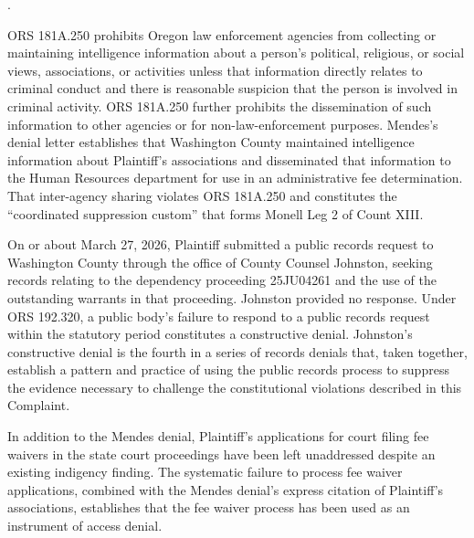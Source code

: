 \documentclass[12pt,letterpaper]{article}
\newcounter{complaintpara}
\newenvironment{paras}{%
	\begin{list}{\arabic{complaintpara}.}{%
			\setlength{\leftmargin}{0.5in}%
			\setlength{\labelwidth}{0.4in}%
			\setlength{\labelsep}{0.1in}%
			\setlength{\itemsep}{0pt}%
			\setlength{\parsep}{0pt}%
			\setlength{\topsep}{6pt}%
		}%
	}{%
	\end{list}%
}
\begin{document}
\begin{paras}
		\item\label{fact:181a250} ORS 181A.250 prohibits Oregon law
		enforcement agencies from collecting or maintaining
		intelligence information about a person's political,
		religious, or social views, associations, or activities unless
		that information directly relates to criminal conduct and there
		is reasonable suspicion that the person is involved in
		criminal activity. ORS 181A.250 further prohibits the
		dissemination of such information to other agencies or for
		non-law-enforcement purposes. Mendes's denial letter
		establishes that Washington County maintained intelligence
		information about Plaintiff's associations and disseminated
		that information to the Human Resources department for use in
		an administrative fee determination. That inter-agency sharing
		violates ORS 181A.250 and constitutes the ``coordinated suppression custom'' that forms Monell Leg 2 of Count XIII.
		
		\item\label{fact:johnston} On or about March 27, 2026, Plaintiff
		submitted a public records request to Washington County
		through the office of County Counsel Johnston, seeking records
		relating to the dependency proceeding 25JU04261 and the use of
		the outstanding warrants in that proceeding. Johnston provided
		no response. Under ORS 192.320, a public body's failure to
		respond to a public records request within the statutory
		period constitutes a constructive denial. Johnston's
		constructive denial is the fourth in a series of records
		denials that, taken together, establish a pattern and practice
		of using the public records process to suppress the evidence
		necessary to challenge the constitutional violations described
		in this Complaint.
		
		\item\label{fact:feewaiver-court} In addition to the Mendes
		denial, Plaintiff's applications for court filing fee waivers
		in the state court proceedings have been left unaddressed
		despite an existing indigency finding. The systematic failure
		to process fee waiver applications, combined with the Mendes
		denial's express citation of Plaintiff's associations,
		establishes that the fee waiver process has been used as an
		instrument of access denial.
		
	\end{paras}
\end{document}
